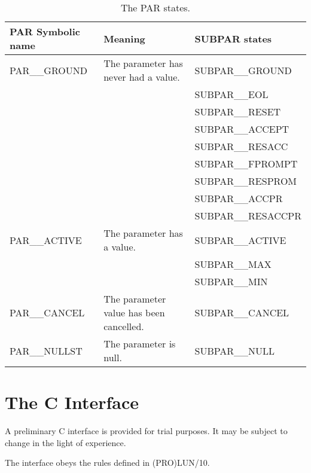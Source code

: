 \documentclass[twoside,11pt,nolof]{starlink}
\begin{document}
\begin{table}[h]
\caption{The PAR states.}
\begin{center}
\begin{tabular}{|l|l|l|}
\hline
PAR Symbolic name & Meaning & SUBPAR states \\ \hline
PAR\_\_GROUND & The parameter has never had a value.    & SUBPAR\_\_GROUND \\
              &                                         & SUBPAR\_\_EOL \\
              &                                         & SUBPAR\_\_RESET \\
              &                                         & SUBPAR\_\_ACCEPT \\
              &                                         & SUBPAR\_\_RESACC \\
              &                                         & SUBPAR\_\_FPROMPT \\
              &                                         & SUBPAR\_\_RESPROM \\
              &                                         & SUBPAR\_\_ACCPR \\
              &                                         & SUBPAR\_\_RESACCPR \\
PAR\_\_ACTIVE & The parameter has a value.              & SUBPAR\_\_ACTIVE \\
              &                                         & SUBPAR\_\_MAX \\
              &                                         & SUBPAR\_\_MIN \\
PAR\_\_CANCEL & The parameter value has been cancelled. & SUBPAR\_\_CANCEL \\
PAR\_\_NULLST & The parameter is null.                  & SUBPAR\_\_NULL \\ \hline
\end{tabular}
\end{center}
\end{table}

\section{The C Interface}
A preliminary C interface is provided for trial purposes. It may be subject to
change in the light of experience.

The interface obeys the rules defined in (PRO)LUN/10.
\end{document}
